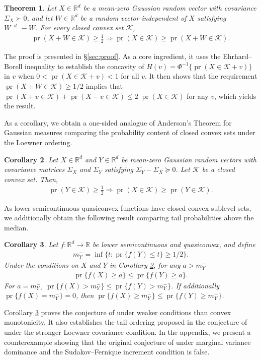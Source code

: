 \documentclass[11pt]{article}
\newcommand{\1}{\mathbbm{1}}
\def\pr{{\operatorname{pr}}}
\theoremstyle{plain}
\newtheorem{theorem}{Theorem}[section]
\newtheorem{corollary}[theorem]{Corollary}
\theoremstyle{definition}
\begin{document}
\begin{theorem}\label{thm:conv}
Let $X\in \mathbb{R}^d$ be a mean-zero Gaussian random vector with covariance $\Sigma_X\succ 0$, and let $W \in \mathbb{R}^d$ be a random vector independent of $X$ satisfying $W \overset{d}{=}-W$. For every closed convex set $\mathcal{K}$,
\begin{align*}
\pr(X+W \in \mathcal{K})\geq \frac{1}{2} \Rightarrow \pr(X \in \mathcal{K})\geq \pr(X+W\in \mathcal{K}).
\end{align*}
\end{theorem}
The proof is presented in \S \ref{sec:proof}. As a core ingredient, it uses the Ehrhard--Borell inequality \citep{ehr83, bor03} to establish the concavity of $H(v) = \Phi^{-1}\{\pr(X \in \mathcal{K}+v)\}$ in $v$ when $0 < \pr(X\in \mathcal{K} + v) < 1$ for all $v$. It then shows that the requirement $\pr(X+W \in \mathcal{K})\geq 1/2$ implies that $\pr(X+v\in \mathcal{K}) + \pr(X-v\in\mathcal{K})\leq 2\;\pr(X\in \mathcal{K})$ for any $v$, which yields the result.


As a corollary, we obtain a one-sided analogue of Anderson's Theorem for Gaussian measures comparing the probability content of closed convex sets under the Loewner ordering. 
\begin{corollary}\label{cor:compare}
 Let $X\in \mathbb{R}^d$  and $Y\in \mathbb{R}^d$ be mean-zero Gaussian random vectors with covariance matrices $\Sigma_X$ and $\Sigma_Y$ satisfying $\Sigma_Y-\Sigma_X \succeq 0$. Let $\mathcal{K}$ be a closed convex set. Then, \begin{align*}\pr(Y\in\mathcal{K})\geq \frac{1}{2}\Rightarrow \pr(X\in \mathcal{K}) \geq \pr(Y\in \mathcal{K}).\end{align*}
\end{corollary}

As lower semicontinuous quasiconvex functions have closed convex sublevel sets, we additionally obtain the following result comparing tail probabilities above the median.
\begin{corollary}\label{cor:median}
Let $f: \mathbb{R}^d\rightarrow \mathbb{R}$ be lower semicontinuous and quasiconvex, and define \begin{align*} m^-_{Y} = \inf\{t : \pr\{f(Y) \leq t\}\geq 1/2\}.\end{align*} Under the conditions on $X$ and $Y$ in Corollary \ref{cor:compare}, for any $a > m^-_Y$
\begin{align*} \pr\{f(X) \geq a\} \leq \pr\{f(Y) \geq a\}.\end{align*}  For $a=m^-_Y$, $\pr\{f(X) > m^-_Y\} \leq \pr\{f(Y) > m^-_Y\}$. If additionally $\pr\{f(X)=m^-_Y\}=0$, then $\pr\{f(X) \geq m^-_Y\} \leq \pr\{f(Y) \geq m^-_Y\}$.
\end{corollary}
Corollary \ref{cor:median} proves the conjecture of \citet{ehm18} under weaker conditions than convex monotonicity. It also establishes the tail ordering proposed in the conjecture of \citet{coh22} under the stronger Loewner covariance condition. In the appendix, we present a counterexample showing that the original conjecture of \citet{coh22} under marginal variance dominance and the Sudakov–Fernique increment condition is false.
\end{document}
